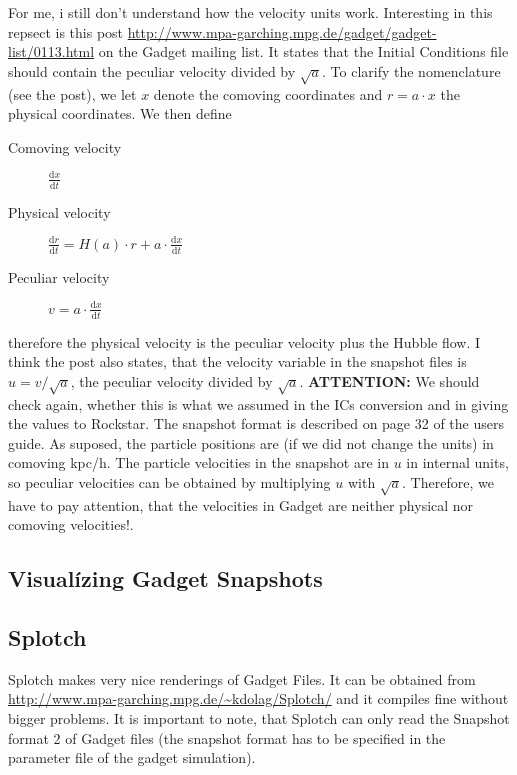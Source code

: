 \documentclass[a4paper,english,10.5pt]{scrartcl}
\begin{document}
For me, i still don't understand how the velocity units work. Interesting in this repsect is this post \url{http://www.mpa-garching.mpg.de/gadget/gadget-list/0113.html} on the Gadget mailing list. It states that the Initial Conditions file should contain the peculiar velocity divided by $\sqrt{a}$. To clarify the nomenclature (see the post), we let $x$ denote the comoving coordinates and $r=a\cdot x$ the physical coordinates. We then define
\begin{description}
 \item[Comoving velocity] $\frac{\textrm{d}x}{\textrm{d}t}$
  \item[Physical velocity] $\frac{\textrm{d}r}{\textrm{d}t} = H(a)\cdot r+a\cdot \frac{\textrm{d}x}{\textrm{d}t}$
  \item[Peculiar velocity] $v = a\cdot \frac{\textrm{d}x}{\textrm{d}t}$ 
\end{description}
therefore the physical velocity is the peculiar velocity plus the Hubble flow. I think the post also states, that the velocity variable in the snapshot files is $u=v/\sqrt{a}$, the peculiar velocity divided by $\sqrt{a}$.
\textbf{ATTENTION:} We should check again, whether this is what we assumed in the ICs conversion and in giving the values to Rockstar.
The snapshot format is described on page 32 of the users guide. As suposed, the particle positions are (if we did not change the units) in comoving kpc/h. The particle velocities in the snapshot are in $u$ in internal units, so peculiar velocities can be obtained by multiplying $u$ with $\sqrt{a}$. Therefore, we have to pay attention, that the velocities in Gadget are neither physical nor comoving velocities!.

\subsection{Visualízing Gadget Snapshots}

\subsection{Splotch}
Splotch makes very nice renderings of Gadget Files. It can be obtained from \url{http://www.mpa-garching.mpg.de/~kdolag/Splotch/}
and it compiles fine without bigger problems. It is important to note, that Splotch can only read the Snapshot format 2 of Gadget files (the 
snapshot format has to be specified in the parameter file of the gadget simulation).
\end{document}
